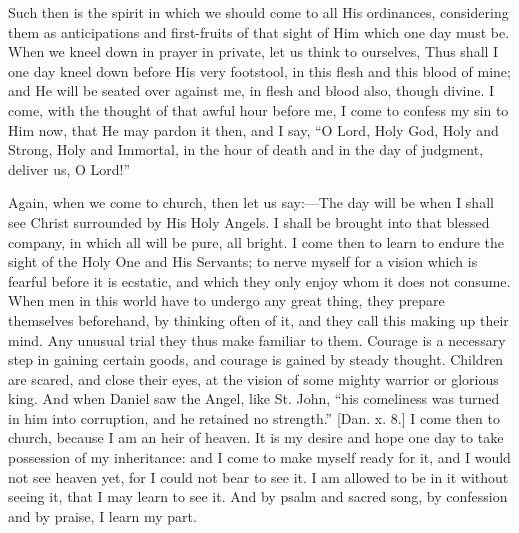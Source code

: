 Such then is the spirit in which we should come to all His
ordinances, considering them as anticipations and first-fruits of that
sight of Him which one day must be. When we kneel down in prayer in
private, let us think to ourselves, Thus shall I one day kneel down
before His very footstool, in this flesh and this blood of mine; and
He will be seated over against me, in flesh and blood also, though
divine. I come, with the thought of that awful hour before me, I come
to confess my sin to Him now, that He may pardon it then, and I say,
``O Lord, Holy God, Holy and Strong, Holy and Immortal, in the
hour of death and in the day of judgment, deliver us, O Lord!''

Again, when we come to church, then let us say:—The day will be
when I shall see Christ surrounded by His Holy Angels. I shall be
brought into that blessed company, in which all will be pure, all
bright. I come then to learn to endure the sight of the Holy One and
His Servants; to nerve myself for a vision which is fearful before it
is ecstatic, and which they only enjoy whom it does not consume. When
men in this world have to undergo any great thing, they prepare
themselves beforehand, by thinking often of it, and they call this
making up their mind. Any unusual trial they thus make familiar to
them. Courage is a necessary step in gaining certain goods, and
courage is gained by steady thought. Children are scared, and close
their eyes, at the vision of some mighty warrior or glorious king. And
when Daniel saw the Angel, like St. John, ``his comeliness was
turned in him into corruption, and he retained no strength.''
[Dan. x. 8.] I come then to church, because I am an heir of heaven. It
is my desire and hope one day to take possession of my inheritance:
and I come to make myself ready for it, and I would not see heaven
yet, for I could not bear to see it. I am allowed to be in it without
seeing it, that I may learn to see it. And by psalm and sacred song,
by confession and by praise, I learn my part.

